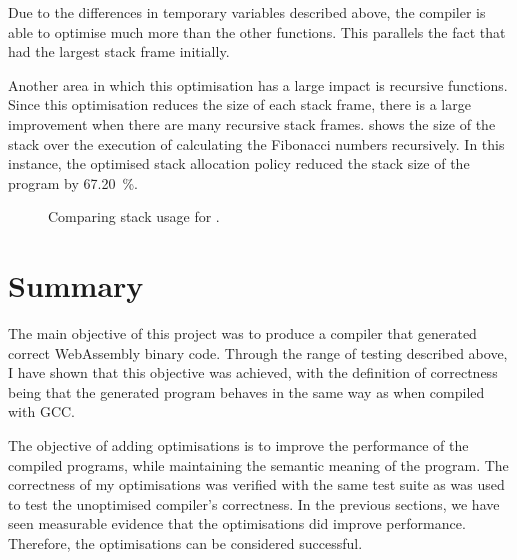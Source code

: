 \documentclass[00-main.tex]{subfiles}
\begin{document}
Due to the differences in temporary variables described above, the compiler is able to optimise  much more than the other functions.
This parallels the fact that  had the largest stack frame initially.


Another area in which this optimisation has a large impact is recursive functions.
Since this optimisation reduces the size of each stack frame, there is a large improvement when there are many recursive stack frames.
 shows the size of the stack over the execution of calculating the Fibonacci numbers recursively.
In this instance, the optimised stack allocation policy reduced the stack size of the program by \SI{67.20}{\percent}.


\begin{figure}[t]
  \centering
  \caption{Comparing stack usage for .}
  \label{fig:comparing stack usage for fibonacci.c} %
\end{figure}



\section{Summary}

The main objective of this project was to produce a compiler that generated correct WebAssembly binary code.
Through the range of testing described above, I have shown that this objective was achieved, with the definition of correctness being that the generated program behaves in the same way as when compiled with GCC\@.

The objective of adding optimisations is to improve the performance of the compiled programs, while maintaining the semantic meaning of the program.
The correctness of my optimisations was verified with the same test suite as was used to test the unoptimised compiler's correctness.
In the previous sections, we have seen measurable evidence that the optimisations did improve performance.
Therefore, the optimisations can be considered successful.
\end{document}

